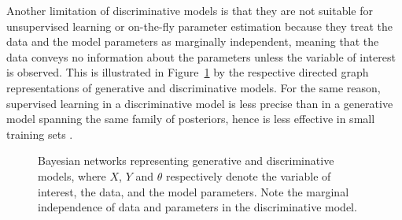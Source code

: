 \documentclass[english]{scrartcl}
\begin{document}

Another limitation of discriminative models is that they are not suitable for unsupervised learning or on-the-fly parameter estimation because they treat the data and the model parameters as marginally independent, meaning that the data conveys no information about the parameters unless the variable of interest is observed. This is illustrated in Figure~\ref{fig:graph_comparison} by the respective directed graph representations of generative and discriminative models. For the same reason, supervised learning in a discriminative model is less precise than in a generative model spanning the same family of posteriors, hence is less effective in small training sets \cite{Ng-01}. 



\begin{figure}[!ht]
\begin{center}
\hspace*{.2\textwidth}
\caption{Bayesian networks representing generative and discriminative models, where $X$, $Y$ and $\theta$ respectively denote the variable of interest, the data, and the model parameters. Note the marginal independence of data and parameters in the discriminative model.}
\label{fig:graph_comparison}
\end{center}
\end{figure}
\end{document}
